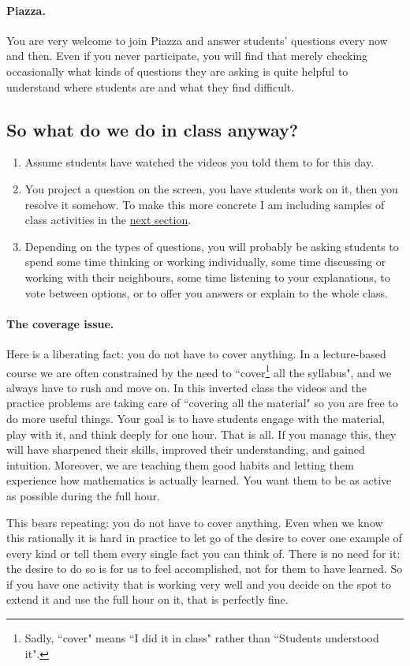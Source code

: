 \documentclass[11pt]{article}
\begin{document}
	\paragraph{Piazza.}
	You are very welcome to join Piazza and answer students' questions every now and
	then. Even if you never participate, you will find that merely checking occasionally
	what kinds of questions they are asking is quite helpful to understand where students
	are and what they find difficult.

	\subsection{So what do we do in class anyway?}

	\begin{enumerate}
		\item Assume students have watched the videos you told them to for this day.

		\item You project a question on the screen, you have students work on it, then
			you resolve it somehow. To make this more concrete I am including samples
			of class activities in the \hyperref[sec:activities]{next section}.

		\item Depending on the types of questions, you will probably be asking
			students to spend some time thinking or working individually, some time discussing
			or working with their neighbours, some time listening to your explanations,
			to vote between options, or to offer you answers or explain to the whole
			class.
	\end{enumerate}

	{\baselineskip \paragraph{The coverage issue.} Here is a liberating fact: you do not have to cover anything. In a lecture-based course we are often constrained by the need to ``cover\footnote{Sadly, ``cover" means ``I did it in class" rather than ``Students understood it".} all the syllabus", and we always have to rush and move on. In this inverted class the videos and the practice problems are taking care of ``covering all the material" so you are free to do more useful things. Your goal is to have students engage with the material, play with it, and think deeply for one hour. That is all. If you manage this, they will have sharpened their skills, improved their understanding, and gained intuition. Moreover, we are teaching them good habits and letting them experience how mathematics is actually learned. You want them to be as active as possible during the full hour.

	This bears repeating: you do not have to cover anything. Even when we know this rationally it is hard in practice to let go of the desire to cover one example of every kind or tell them every single fact you can think of. There is no need for it: the desire to do so is for us to feel accomplished, not for them to have learned. So if you have one activity that is working very well and you decide on the spot to extend it and use the full hour on it, that is perfectly fine. }
\end{document}
